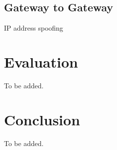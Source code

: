 \documentclass[article]{aaltoseries}
\begin{document}
\subsection{Gateway to Gateway}

IP address spoofing



\section{Evaluation}

To be added.




\section{Conclusion}

To be added.












\end{document}
